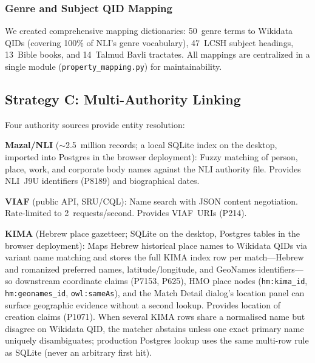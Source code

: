 \documentclass[Afour,sageh,times]{sagej}
\begin{document}
\subsubsection{Genre and Subject QID Mapping}

We created comprehensive mapping dictionaries: 50~genre terms to Wikidata QIDs (covering 100\% of NLI's genre vocabulary), 47~LCSH subject headings, 13~Bible books, and 14~Talmud Bavli tractates. All mappings are centralized in a single module (\texttt{property\_mapping.py}) for maintainability.

\subsection{Strategy C: Multi-Authority Linking}

Four authority sources provide entity resolution:

\textbf{Mazal/NLI} ($\sim$2.5~million records; a local SQLite index on the desktop, imported into Postgres in the browser deployment): Fuzzy matching of person, place, work, and corporate body names against the NLI authority file. Provides NLI~J9U identifiers (P8189) and biographical dates.

\textbf{VIAF} (public API, SRU/CQL): Name search with JSON content negotiation. Rate-limited to 2~requests/second. Provides VIAF~URIs (P214).

\textbf{KIMA} (Hebrew place gazetteer; SQLite on the desktop, Postgres tables in the browser deployment): Maps Hebrew historical place names to Wikidata QIDs via variant name matching and stores the full KIMA index row per match---Hebrew and romanized preferred names, latitude/longitude, and GeoNames identifiers---so downstream coordinate claims (P7153, P625), HMO place nodes (\texttt{hm:kima\_id}, \texttt{hm:geonames\_id}, \texttt{owl:sameAs}), and the Match Detail dialog's location panel can surface geographic evidence without a second lookup. Provides location of creation claims (P1071). When several KIMA rows share a normalised name but disagree on Wikidata QID, the matcher abstains unless one exact primary name uniquely disambiguates; production Postgres lookup uses the same multi-row rule as SQLite (never an arbitrary first hit).
\end{document}
